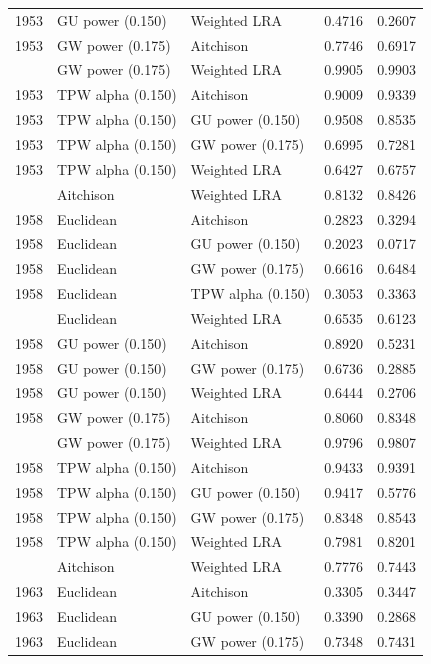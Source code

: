 \begin{longtable}[t]{rllrr}
1953 & GU power (0.150) & Weighted LRA & 0.4716 & 0.2607\\
1953 & GW power (0.175) & Aitchison & 0.7746 & 0.6917\\
\addlinespace
1953 & GW power (0.175) & Weighted LRA & 0.9905 & 0.9903\\
1953 & TPW alpha (0.150) & Aitchison & 0.9009 & 0.9339\\
1953 & TPW alpha (0.150) & GU power (0.150) & 0.9508 & 0.8535\\
1953 & TPW alpha (0.150) & GW power (0.175) & 0.6995 & 0.7281\\
1953 & TPW alpha (0.150) & Weighted LRA & 0.6427 & 0.6757\\
\addlinespace
1958 & Aitchison & Weighted LRA & 0.8132 & 0.8426\\
1958 & Euclidean & Aitchison & 0.2823 & 0.3294\\
1958 & Euclidean & GU power (0.150) & 0.2023 & 0.0717\\
1958 & Euclidean & GW power (0.175) & 0.6616 & 0.6484\\
1958 & Euclidean & TPW alpha (0.150) & 0.3053 & 0.3363\\
\addlinespace
1958 & Euclidean & Weighted LRA & 0.6535 & 0.6123\\
1958 & GU power (0.150) & Aitchison & 0.8920 & 0.5231\\
1958 & GU power (0.150) & GW power (0.175) & 0.6736 & 0.2885\\
1958 & GU power (0.150) & Weighted LRA & 0.6444 & 0.2706\\
1958 & GW power (0.175) & Aitchison & 0.8060 & 0.8348\\
\addlinespace
1958 & GW power (0.175) & Weighted LRA & 0.9796 & 0.9807\\
1958 & TPW alpha (0.150) & Aitchison & 0.9433 & 0.9391\\
1958 & TPW alpha (0.150) & GU power (0.150) & 0.9417 & 0.5776\\
1958 & TPW alpha (0.150) & GW power (0.175) & 0.8348 & 0.8543\\
1958 & TPW alpha (0.150) & Weighted LRA & 0.7981 & 0.8201\\
\addlinespace
1963 & Aitchison & Weighted LRA & 0.7776 & 0.7443\\
1963 & Euclidean & Aitchison & 0.3305 & 0.3447\\
1963 & Euclidean & GU power (0.150) & 0.3390 & 0.2868\\
1963 & Euclidean & GW power (0.175) & 0.7348 & 0.7431\\

\end{longtable}
